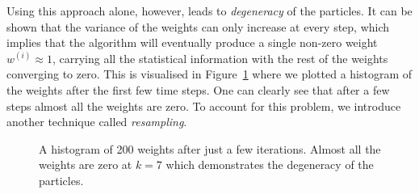 Using this approach alone, however, leads to \emph{degeneracy} of the
particles. It can be shown that the variance of the weights can only
increase at every step, which implies that the algorithm will
eventually produce a single non-zero weight $w^{(i)} \approx 1$,
carrying all the statistical information with the rest of the weights
converging to zero. This is visualised in Figure~\ref{fig:weights}
where we plotted a histogram of the weights after the first few time
steps. One can clearly see that after a few steps almost all the
weights are zero. To account for this problem, we introduce another
technique called \emph{resampling}.
\begin{figure}[hbtp]
  \centering {}
  \caption{A histogram of 200 weights after just a few
    iterations. Almost all the weights are zero at $k = 7$ which
    demonstrates the degeneracy of the particles.}
  \label{fig:weights}
\end{figure}


